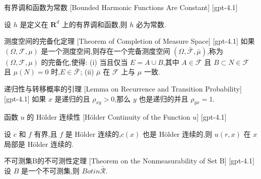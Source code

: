 \documentclass[UTF8]{ctexart}
\begin{document}
    
    
    \begin{thm}
        {有界调和函数为常数}
        [Bounded Harmonic Functions Are Constant]
        [gpt-4.1]
        
设 $h$ 是定义在 $\mathbf{R}^d$ 上的有界调和函数,则 $h$ 必为常数.

    \end{thm}
    
    
    
    \begin{thm}
        {测度空间的完备化定理}
        [Theorem of Completion of Measure Space]
        [gpt-4.1]
        如果 $(\Omega, \mathcal{F}, \mu)$ 是一个测度空间,则存在一个完备测度空间 $(\Omega, \bar{\mathcal{F}}, \bar{\mu})$,称为 $(\Omega, \mathcal{F}, \mu)$ 的完备化,使得:
(i) 当且仅当 $E = A \cup B$,其中 $A \in \mathcal{F}$ 且 $B \subset N \in \mathcal{F}$ 且 $\mu(N) = 0$ 时,$E \in \bar{\mathcal{F}}$;
(ii) $\bar{\mu}$ 在 $\mathcal{F}$ 上与 $\mu$ 一致.

    \end{thm}
    
    
    
    \begin{lma}
        {递归性与转移概率的引理}
        [Lemma on Recurrence and Transition Probability]
        [gpt-4.1]
        如果 $x$ 是递归的且 $\rho_{xy} > 0$,那么 $y$ 也是递归的并且 $\rho_{yx} = 1$.
    \end{lma}
    
    
    
    \begin{thm}
        {函数 $
    u$ 的 Hölder 连续性}
        [Hölder Continuity of the Function $
    u$]
        [gpt-4.1]
        
设 $c$ 和 $f$ 有界,且 $f$ 是 Hölder 连续的,$c(x)$ 也是 Hölder 连续的,则 $
u(r, x)$ 在 $x$ 局部是 Hölder 连续的.

    \end{thm}
    
    
    
    \begin{thm}
        {不可测集B的不可测性定理}
        [Theorem on the Nonmeasurability of Set B]
        [gpt-4.1]
        设 $B$ 是一个不可测集,则 $B 
otin \bar { \mathcal { R } }$.
    \end{thm}
    
\end{document}
